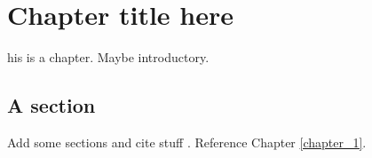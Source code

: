 \chapter{Chapter title here}\label{chapter_2}


his is a chapter. Maybe introductory. \lipsum[1-2] 

\section{A section}
Add some sections and cite stuff \cite{citation1}. Reference Chapter \ref{chapter_1}. \lipsum[4-5]